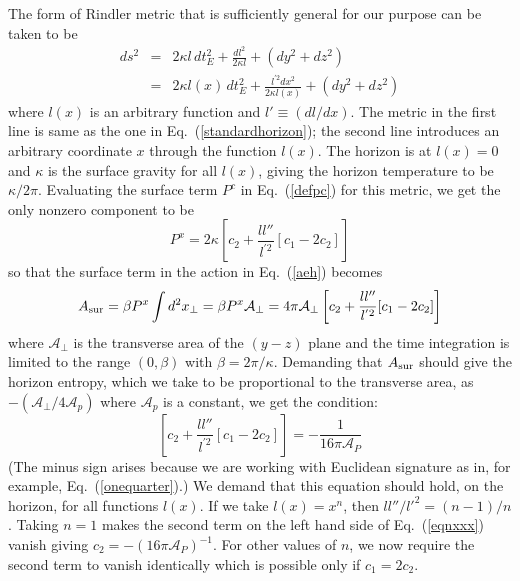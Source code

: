 \documentclass[12pt]{iopart}
\def\eq#1{{Eq.~(\ref{#1})}}
\begin{document}
 
      The form of Rindler metric that is sufficiently general for our purpose can be taken to be
  \begin{eqnarray}
    \label{rindmetric}
  ds^2 &=& 2\kappa l\, dt_E^2 + \frac{dl^2}{2\kappa l} + (dy^2+dz^2) \\
  &=& 2\kappa l(x) \, dt_E^2 + \frac{l^{'2}dx^2 }{2\kappa l(x)} + (dy^2+dz^2)\nonumber
  \end{eqnarray}
  where $l(x)$ is an arbitrary function and $l' \equiv (dl/dx)$. 
  The metric in the first line is same as the one in \eq{standardhorizon}; the second line introduces an arbitrary coordinate $x$ through the function $l(x)$. The horizon is at $l(x)=0$ and $\kappa$ is the surface gravity for all $l(x)$, giving the horizon temperature to be $\kappa/2\pi$.
  Evaluating the surface term $P^c$ in Eq.~(\ref{defpc})
  for this metric, we get
  the only nonzero component to be
  \begin{equation}
  P^x = 2\kappa \left[  c_2 +  \frac{ll''}{l^{'2}} [c_1- 2 c_2]\right]
  \end{equation}
       so that the surface term in the action in Eq.~(\ref{aeh})
    becomes 
    \begin{equation}
    A_{\rm sur}=\beta P^x \int d^2x_\perp =\beta P^x \mathcal{A}_\perp
    = 4\pi  \mathcal{A}_\perp\left[  c_2 +  \frac{ll''}{l^{'2}} [c_1- 2 c_2]\right]
    \label{detcone}
    \end{equation}   
    where $\mathcal{A}_\perp$ is the transverse area of the $(y-z)$ plane and the time integration is limited to the range $(0, \beta)$ with $\beta = 2\pi/\kappa$.
     Demanding that $A_{\rm sur}$ should give the horizon entropy, which we take
     to be proportional to the transverse area,
     as  $-(\mathcal{A}_\perp / 4\mathcal{A}_p)$ where $\mathcal{A}_p$ is a constant, we get the condition:
     \begin{equation}
      \left[  c_2 +  \frac{ll''}{l^{'2}} [c_1- 2 c_2]\right]= - \frac{1}{16\pi \mathcal{A}_P}
     \label{eqnxxx}
     \end{equation}
     (The minus sign arises because we are working with Euclidean signature as in, for example, \eq{onequarter}.)
    We demand that this equation should hold,  on the horizon, for all functions $l(x)$.
    If we take $l(x)=x^n$, then $ll''/l'^2 = (n-1)/n$. Taking $n=1 $ makes the second term on the left hand side of \eq{eqnxxx} vanish giving $c_2=-(16\pi \mathcal{A}_P)^{-1}$.
    For other values of $n$, we now require the second term to vanish identically which is possible only if  $c_1 = 2 c_2$. 
\end{document}
